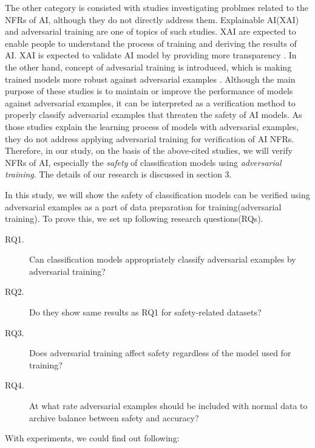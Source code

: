 \documentclass[symmetry,article,submit,moreauthors,pdftex]{Definitions/mdpi}
\begin{document}
The other category is consisted with studies investigating problmes related to the NFRs of AI, although they do not directly address them.
Explainable AI(XAI) and adversarial training are one of topics of such studies.
XAI are expected to enable people to understand the process of training and deriving the results of AI. 
XAI is expected to validate AI model by providing more transparency \cite{xai-arrieta,xai-samek,xai-transparency-murdoch,xai-transparency-ribeiro,ai-medical-xai-holzinger}.
In the other hand, concept of advesarial training is introduced, which is making trained models more robust against adversarial examples \cite{adversarial-goodfellow,adversarial-kurakin,adversarial-kurakin2,adversarial-papernot,adversarial-szegedy,adversarial-yuan}.
Although the main purpose of these studies is to maintain or improve the performance of models against adversarial examples, it can be interpreted as a verification method to properly classify adversarial examples that threaten the safety of AI models.
As those studies explain the learning process of models with adversarial examples, they do not address applying adversarial training for verification of AI NFRs.
Therefore, in our study, on the basis of the above-cited studies, we will verify NFRs of AI, especially the \textit{safety} of classification models using \textit{adversarial training}.
The details of our research is discussed in section 3.

In this study, we will show the safety of classification models can be verified using adversarial examples as a part of data preparation for training(adversarial training).
To prove this, we set up following research questions(RQs).

\begin{description}
    \item[RQ1.]	Can classification models appropriately classify adversarial examples by adversarial training?
    \item[RQ2.]	Do they show same results as RQ1 for safety-related datasets?
    \item[RQ3.] Does adversarial training affect safety regardless of the model used for training?
    \item[RQ4.]	At what rate adversarial examples should be included with normal data to archive balance between safety and accuracy?
\end{description}

With experiments, we could find out following:
\end{document}
